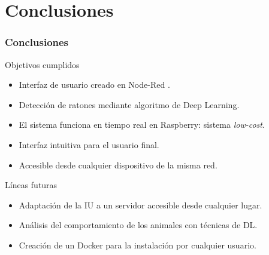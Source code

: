 \documentclass{beamer}
\begin{document}
\section{Conclusiones}
\begin{frame}
\frametitle{Conclusiones}
\begin{block}{Objetivos cumplidos}
\begin{itemize}
\item Interfaz de usuario creado en Node-Red .
\item Detección de ratones mediante algoritmo de Deep Learning.
\item El sistema funciona en tiempo real en Raspberry: sistema \textit{low-cost}.
\item Interfaz intuitiva para el usuario final.
\item Accesible desde cualquier dispositivo de la misma red.
\end{itemize}
\end{block}

\begin{block}{Líneas futuras}
\begin{itemize}
\item Adaptación de la IU a un servidor accesible desde cualquier lugar.
\item Análisis del comportamiento de los animales con técnicas de DL.
\item Creación de un Docker para la instalación por cualquier usuario.
\end{itemize}
\end{block}
\end{frame}

\begin{frame}[plain]
\large{\titlepage}
\end{frame}
\endgroup
\end{document}
